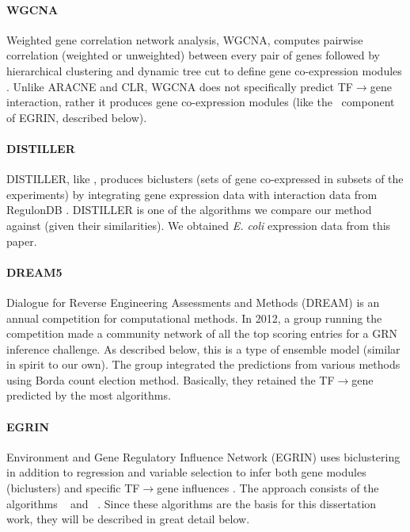 \paragraph{WGCNA} Weighted gene correlation network analysis, WGCNA, computes pairwise correlation (weighted or unweighted) between every pair of genes followed by hierarchical clustering and dynamic tree cut to define gene co-expression modules \cite{langfelder_wgcna:_2008}. Unlike ARACNE and CLR, WGCNA does not specifically predict TF$\rightarrow$gene interaction, rather it produces gene co-expression modules (like the \cm\ component of EGRIN, described below).

\paragraph{DISTILLER} DISTILLER, like \cm, produces biclusters (sets of gene co-expressed in subsets of the experiments) by integrating gene expression data with interaction data from RegulonDB \cite{lemmens_distiller:_2009}. DISTILLER is one of the algorithms we compare our method against (given their similarities). We obtained \textit{E. coli} expression data from this paper. 

\paragraph{DREAM5} Dialogue for Reverse Engineering Assessments and Methods (DREAM) is an annual competition for computational methods. In 2012, a group running the competition made a community network of all the top scoring entries for a GRN inference challenge. As described below, this is a type of ensemble model (similar in spirit to our own). The group integrated the predictions from various methods using Borda count election method. Basically, they retained the TF$\rightarrow$gene predicted by the most algorithms. 

\paragraph{EGRIN} Environment and Gene Regulatory Influence Network (EGRIN) uses biclustering in addition to regression and variable selection to infer both gene modules (biclusters) and specific TF$\rightarrow$gene influences \cite{bonneau_predictive_2007}. The approach consists of the algorithms \cm\ \cite{reiss_integrated_2006} and \nwinf\ \cite{bonneau_inferelator:_2006}. Since these algorithms are the basis for this dissertation work, they will be described in great detail below. \\


